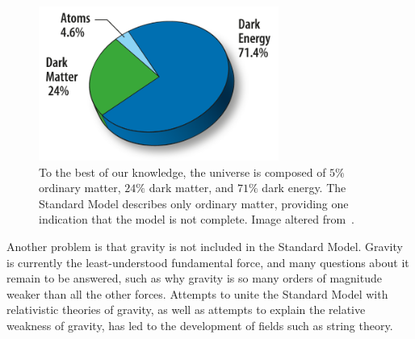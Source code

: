 \begin{figure}[htbp]
    \centering
    \includegraphics[width=0.7\textwidth]{Images/Background/universe_composition.png}
    \caption{To the best of our knowledge, the universe is composed of $5\%$ ordinary matter, $24\%$ dark matter, and $71\%$ dark energy. The Standard Model describes only ordinary matter, providing one indication that the model is not complete. Image altered from~\cite{universe_composition}.}
    \label{fig:universe_composition}
\end{figure}

Another problem is that gravity is not included in the Standard Model. Gravity is currently the least-understood fundamental force, and many questions about it remain to be answered, such as why gravity is so many orders of magnitude weaker than all the other forces. Attempts to unite the Standard Model with relativistic theories of gravity, as well as attempts to explain the relative weakness of gravity, has led to the development of fields such as string theory.

